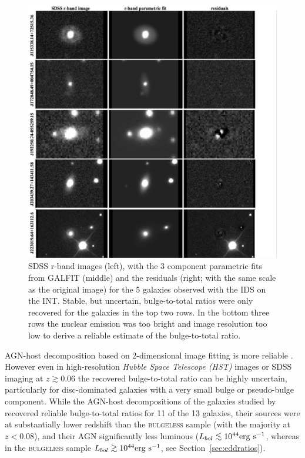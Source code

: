 {\begin{figure}
\centering
\includegraphics[width=\textwidth]{agn/galfit_residuals.pdf}
\caption[Parametric fits and residuals for the 5 galaxies observed at the INT]{SDSS r-band images (left), with the 3 component parametric fits from GALFIT (middle) and the residuals (right; with the same scale as the original image) for the 5 galaxies observed with the IDS on the INT. Stable, but uncertain, bulge-to-total ratios were only recovered for the galaxies in the top two rows. In the bottom three rows the nuclear emission was too bright and image resolution too low to derive a reliable estimate of the bulge-to-total ratio.
}
\label{fig:galfit}
\end{figure}

AGN-host decomposition based on 2-dimensional image fitting \citep[e.g.,][]{simard98,peng02,peng10} is more reliable \citep[e.g.][]{mclure99,urry00,mclure01,sanchez04,pierce07,gabor09,Simmons11,Simmons13,koss11}. However even in high-resolution \emph{Hubble Space Telescope (HST)} images \citep{simmons08} or SDSS imaging at $z \gtrsim 0.06$ \citep[][]{koss11,Simmons13} the recovered bulge-to-total ratio can be highly uncertain, particularly for disc-dominated galaxies with a very small bulge or pseudo-bulge \citep{kormendy04} component. While the AGN-host decompositions of the galaxies studied by \citet{Simmons13} recovered reliable bulge-to-total ratios for 11 of the 13 galaxies, their sources were at substantially lower redshift than the \textsc{bulgeless} sample (with the majority at $z < 0.08$), and their AGN significantly less luminous ($L_{bol} \lesssim 10^{44} \rm{erg}~\rm{s}^{-1}$, whereas in the \textsc{bulgeless} sample $L_{bol} \gtrsim 10^{44} \rm{erg}~\rm{s}^{-1}$, see Section~\ref{sec:eddratios}). 

}
